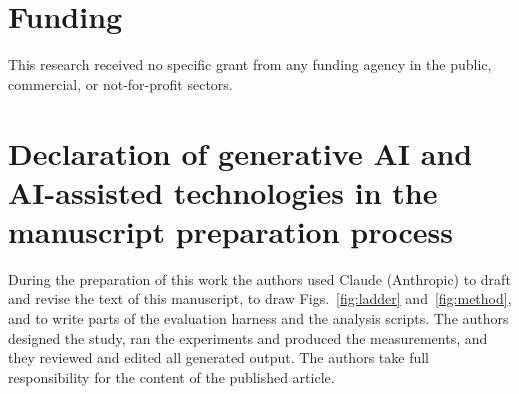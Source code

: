 \documentclass[review,10pt,times]{elsarticle}
\begin{document}
\section*{Funding}
This research received no specific grant from any funding agency in the
public, commercial, or not-for-profit sectors.

\section*{Declaration of generative AI and AI-assisted technologies in the
manuscript preparation process}
During the preparation of this work the authors used Claude (Anthropic) to
draft and revise the text of this manuscript, to draw
Figs.~\ref{fig:ladder} and~\ref{fig:method}, and to write parts of the
evaluation harness and the analysis scripts.  The authors designed the
study, ran the experiments and produced the measurements, and they reviewed
and edited all generated output.  The authors take full responsibility for
the content of the published article.



\end{document}
